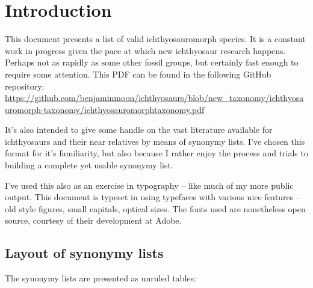 
\section{Introduction}

This document presents a list of valid ichthyosauromorph species. It is a constant work in progress given the pace at which new ichthyosaur research happens. Perhaps not as rapidly as some other fossil groups, but certainly fast enough to require some attention. This PDF can be found in the following GitHub repository: \url{https://github.com/benjaminmoon/ichthyosaurs/blob/new_taxonomy/ichthyosauromorph-taxonomy/ichthyosauromorphtaxonomy.pdf}

It's also intended to give some handle on the vast literature available for ichthyosaurs and their near relatives by means of synonymy lists. I've chosen this format for it's familiarity, but also because I rather enjoy the process and trials to building a complete yet usable synonymy list.

I've used this also as an exercise in typography – like much of my more public output. This document is typeset in \LuaLaTeX{} using typefaces with various nice features – old style figures, small capitals, optical sizes. The fonts used are nonetheless open source, courtesy of their development at Adobe.

\subsection{Layout of synonymy lists}%
\label{ssec:key-synonymy-lists}

The synonymy lists are presented as unruled tables:

